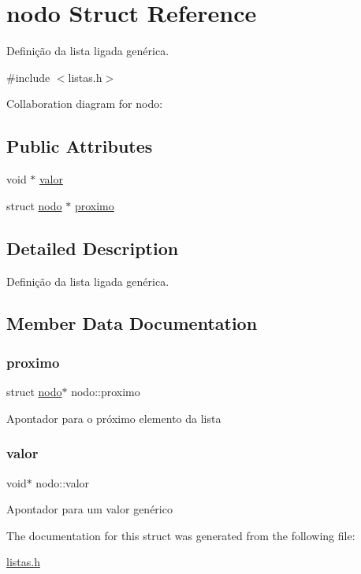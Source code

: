 \hypertarget{structnodo}{}\section{nodo Struct Reference}
\label{structnodo}


Definição da lista ligada genérica.  




{\ttfamily \#include $<$listas.\+h$>$}



Collaboration diagram for nodo\+:
\subsection*{Public Attributes}
\begin{DoxyCompactItemize}
\item 
void $\ast$ \hyperlink{structnodo_ab63adcdb83ea1fdcf4fa10f3cafc4a6a}{valor}
\item 
struct \hyperlink{structnodo}{nodo} $\ast$ \hyperlink{structnodo_aaaabdcb6641ddcdac8990402242b154a}{proximo}
\end{DoxyCompactItemize}


\subsection{Detailed Description}
Definição da lista ligada genérica. 

\subsection{Member Data Documentation}
\mbox{\label{structnodo_aaaabdcb6641ddcdac8990402242b154a}} 
\subsubsection{\texorpdfstring{proximo}{proximo}}
{\footnotesize\ttfamily struct \hyperlink{structnodo}{nodo}$\ast$ nodo\+::proximo}

Apontador para o próximo elemento da lista \mbox{\label{structnodo_ab63adcdb83ea1fdcf4fa10f3cafc4a6a}} 
\subsubsection{\texorpdfstring{valor}{valor}}
{\footnotesize\ttfamily void$\ast$ nodo\+::valor}

Apontador para um valor genérico 

The documentation for this struct was generated from the following file\+:\begin{DoxyCompactItemize}
\item 
\hyperlink{listas_8h}{listas.\+h}\end{DoxyCompactItemize}
